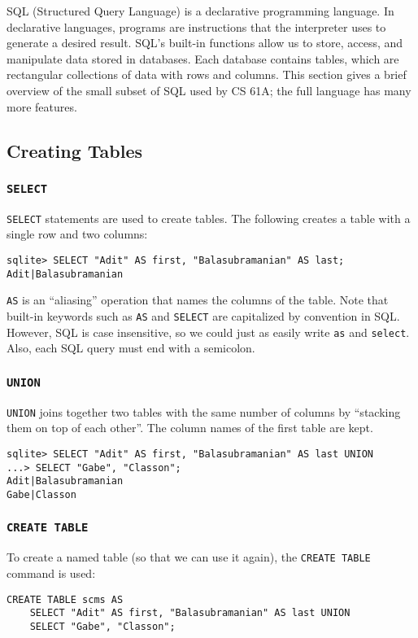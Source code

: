 SQL (Structured Query Language) is a declarative programming language. In declarative languages, programs are instructions that the interpreter uses to generate a desired result. 
SQL's built-in functions allow us to store, access, and manipulate data stored in databases. Each database contains tables, which are rectangular collections of data with rows and columns.
This section gives a brief overview of the small subset of SQL used by CS 61A; the full language has many more features. 

\subsection{Creating Tables}
\subsubsection{\lstinline{SELECT}}
\lstinline{SELECT} statements are used to create tables. The following creates a table with a single row and two columns: 
\begin{lstlisting}
sqlite> SELECT "Adit" AS first, "Balasubramanian" AS last;
Adit|Balasubramanian    
\end{lstlisting}

\lstinline{AS} is an ``aliasing'' operation that names the columns of the table. Note that built-in keywords such as \lstinline{AS} and \lstinline{SELECT} are capitalized by convention in SQL. However, SQL is case insensitive, so we could just as easily write \lstinline{as} and \lstinline{select}. Also, each SQL query must end with a semicolon. 

\subsubsection{\lstinline{UNION}}
\lstinline{UNION} joins together two tables with the same number of columns by ``stacking them on top of each other''. The column names of the first table are kept. 

\begin{lstlisting}
sqlite> SELECT "Adit" AS first, "Balasubramanian" AS last UNION
...> SELECT "Gabe", "Classon";
Adit|Balasubramanian
Gabe|Classon
\end{lstlisting}

\subsubsection{\lstinline{CREATE TABLE}}
To create a named table (so that we can use it again), the \lstinline{CREATE TABLE} command is used: 
\begin{lstlisting}
CREATE TABLE scms AS 
    SELECT "Adit" AS first, "Balasubramanian" AS last UNION
    SELECT "Gabe", "Classon";
\end{lstlisting}

